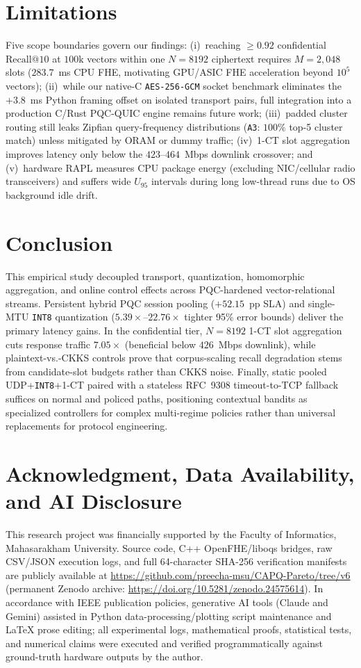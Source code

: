 \documentclass[10pt,journal,compsoc]{IEEEtran}
\begin{document}
\section{Limitations}\label{sec:limitations}
Five scope boundaries govern our findings: (i)~reaching $\ge 0.92$ confidential $\mathrm{Recall}@10$ at $100\text{k}$ vectors within one $N=8192$ ciphertext requires $M=2{,}048$ slots ($283.7$~ms CPU FHE, motivating GPU/ASIC FHE acceleration beyond $10^5$ vectors); (ii)~while our native-C \texttt{AES-256-GCM} socket benchmark eliminates the $+3.8$~ms Python framing offset on isolated transport pairs, full integration into a production C/Rust PQC-QUIC engine remains future work; (iii)~padded cluster routing still leaks Zipfian query-frequency distributions (\texttt{A3}: $100\%$ top-5 cluster match) unless mitigated by ORAM or dummy traffic; (iv)~1-CT slot aggregation improves latency only below the $423\text{--}464$~Mbps downlink crossover; and (v)~hardware RAPL measures CPU package energy (excluding NIC/cellular radio transceivers) and suffers wide $U_{95}$ intervals during long low-thread runs due to OS background idle drift.

\section{Conclusion}\label{sec:conclusion}
This empirical study decoupled transport, quantization, homomorphic aggregation, and online control effects across PQC-hardened vector-relational streams. Persistent hybrid PQC session pooling ($+52.15$~pp SLA) and single-MTU \texttt{INT8} quantization ($5.39\times\text{--}22.76\times$ tighter 95\% error bounds) deliver the primary latency gains. In the confidential tier, $N=8192$ 1-CT slot aggregation cuts response traffic $7.05\times$ (beneficial below $426$~Mbps downlink), while plaintext-vs.-CKKS controls prove that corpus-scaling recall degradation stems from candidate-slot budgets rather than CKKS noise. Finally, static pooled UDP+\texttt{INT8}+1-CT paired with a stateless RFC~9308 timeout-to-TCP fallback suffices on normal and policed paths, positioning contextual bandits as specialized controllers for complex multi-regime policies rather than universal replacements for protocol engineering.

\section*{Acknowledgment, Data Availability, and AI Disclosure}
This research project was financially supported by the Faculty of Informatics, Mahasarakham University. Source code, C++ OpenFHE/liboqs bridges, raw CSV/JSON execution logs, and full 64-character SHA-256 verification manifests are publicly available at \url{https://github.com/preecha-msu/CAPQ-Pareto/tree/v6} (permanent Zenodo archive: \url{https://doi.org/10.5281/zenodo.24575614}). In accordance with IEEE publication policies, generative AI tools (Claude and Gemini) assisted in Python data-processing/plotting script maintenance and LaTeX prose editing; all experimental logs, mathematical proofs, statistical tests, and numerical claims were executed and verified programmatically against ground-truth hardware outputs by the author.
\end{document}
